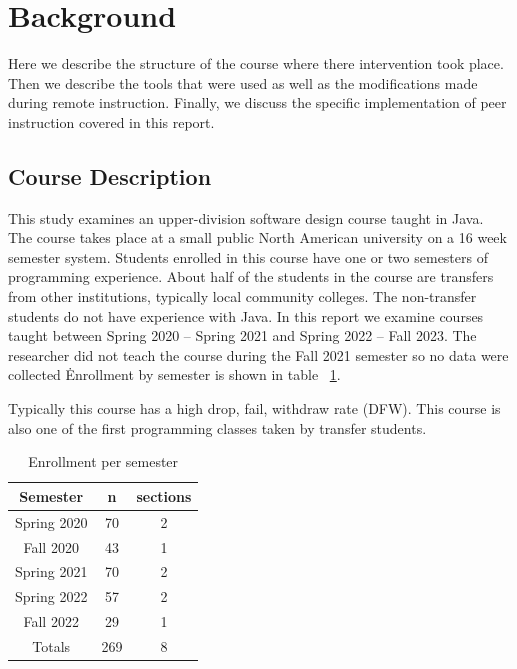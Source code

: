 \documentclass[12pt]{article}
\newcommand\sampleSize{163}
\newcommand\classSize{269}
\begin{document}
\section{Background}

Here we describe the structure of the course where there intervention took place. Then we describe the tools that were used as well as the modifications made during remote instruction. Finally, we discuss the specific implementation of peer instruction covered in this report.

\subsection{Course Description}
This study examines an upper-division software design course taught in Java. The course takes place at a small public North American university on a 16 week semester system. Students enrolled in this course have one or two semesters of programming experience. About half of the students in the course are transfers from other institutions, typically local community colleges. The non-transfer students do not have experience with Java. 
In this report we examine courses taught between Spring 2020 – Spring 2021 and Spring 2022 – Fall 2023.  The researcher did not teach the course during the Fall 2021 semester so no data were collected \. Enrollment by semester is shown in table ~\ref{table:enrollmentBySemester}.

Typically this course has a high drop, fail, withdraw rate (DFW).  This course is also one of the first programming classes taken by transfer students.


\begin{table}[ht]
\centering
\caption{Enrollment per semester}
\begin{tabular}{|c|c|c|}
\toprule
Semester    & n  & sections\\ \midrule
\rowcolor{LightGray}
Spring 2020 & 70 & 2 \\ \midrule
Fall 2020   & 43 & 1 \\ \midrule
\rowcolor{LightGray}
Spring 2021 & 70 & 2 \\ \midrule
Spring 2022 & 57 & 2 \\ \midrule
\rowcolor{LightGray}
Fall 2022 & 29 & 1 \\ \midrule
Totals & \classSize & 8 \\ \bottomrule
\end{tabular}
\label{table:enrollmentBySemester}
\end{table}
\end{document}

